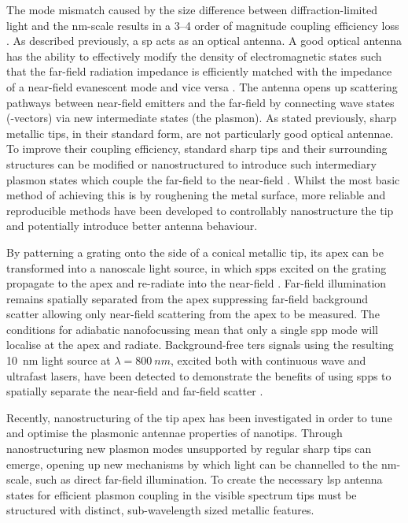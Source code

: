 \documentclass{article}
\begin{document}
The mode mismatch caused by the size difference between diffraction-limited light and the nm-scale results in a 3--4 order of magnitude coupling efficiency loss \cite{berweger2010}. As described previously, a \gls{sp} acts as an optical antenna. A good optical antenna has the ability to effectively modify the density of electromagnetic states such that the far-field radiation impedance is efficiently matched with the impedance of a near-field evanescent mode and vice versa \cite{novotny2006, novotny2011}. The antenna opens up scattering pathways between near-field emitters and the far-field by connecting wave states (\wvm-vectors) via new intermediate states (the plasmon). As stated previously, sharp metallic tips, in their standard form, are not particularly good optical antennae. To improve their coupling efficiency, standard sharp tips and their surrounding structures can be modified or nanostructured to introduce such intermediary plasmon states which couple the far-field to the near-field \cite{mauser2014}. Whilst the most basic method of achieving this is by roughening the metal surface, more reliable and reproducible methods have been developed to controllably nanostructure the tip and potentially introduce better antenna behaviour.

By patterning a grating onto the side of a conical metallic tip, its apex can be transformed into a nanoscale light source, in which \glspl{spp} excited on the grating propagate to the apex and re-radiate into the near-field \cite{neacsu2010}. Far-field illumination remains spatially separated from the apex suppressing far-field background scatter allowing only near-field scattering from the apex to be measured. The conditions for adiabatic nanofocussing mean that only a single \gls{spp} mode will localise at the apex and radiate. Background-free \gls{ters} signals using the resulting \SI{10}{nm} light source at $\lambda=\SI{800}{nm}$, excited both with continuous wave and ultrafast lasers, have been detected to demonstrate the benefits of using \glspl{spp} to spatially separate the near-field and far-field scatter \cite{berweger2010, berweger2012}.

Recently, nanostructuring of the tip apex has been investigated in order to tune and optimise the plasmonic antennae properties of nanotips. Through nanostructuring new plasmon modes unsupported by regular sharp tips can emerge, opening up new mechanisms by which light can be channelled to the nm-scale, such as direct far-field illumination. To create the necessary \gls{lsp} antenna states for efficient plasmon coupling in the visible spectrum tips must be structured with distinct, sub-wavelength sized metallic features.
\end{document}
